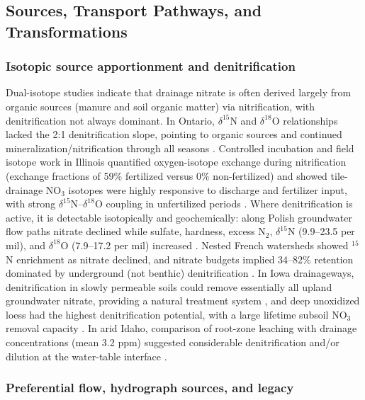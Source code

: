 \documentclass[11pt]{article}
\begin{document}
\subsection{Sources, Transport Pathways, and Transformations}

\subsubsection{Isotopic source apportionment and denitrification}

Dual-isotope studies indicate that drainage nitrate is often derived largely from organic sources (manure and soil organic matter) via nitrification, with denitrification not always dominant. In Ontario, $\delta^{15}$N and $\delta^{18}$O relationships lacked the 2:1 denitrification slope, pointing to organic sources and continued mineralization/nitrification through all seasons \parencite{Smith2011,Smith2011b}. Controlled incubation and field isotope work in Illinois quantified oxygen-isotope exchange during nitrification (exchange fractions of 59\% fertilized versus 0\% non-fertilized) and showed tile-drainage NO$_3$ isotopes were highly responsive to discharge and fertilizer input, with strong $\delta^{15}$N--$\delta^{18}$O coupling in unfertilized periods \parencite{Hu2024}. Where denitrification is active, it is detectable isotopically and geochemically: along Polish groundwater flow paths nitrate declined while sulfate, hardness, excess N$_2$, $\delta^{15}$N (9.9--23.5 per mil), and $\delta^{18}$O (7.9--17.2 per mil) increased \parencite{Dragon2016}. Nested French watersheds showed $^{15}$N enrichment as nitrate declined, and nitrate budgets implied 34--82\% retention dominated by underground (not benthic) denitrification \parencite{Billy2011,Billy2013}. In Iowa drainageways, denitrification in slowly permeable soils could remove essentially all upland groundwater nitrate, providing a natural treatment system \parencite{Schilling2007}, and deep unoxidized loess had the highest denitrification potential, with a large lifetime subsoil NO$_3$ removal capacity \parencite{Cambardella1999}. In arid Idaho, comparison of root-zone leaching with drainage concentrations (mean 3.2 ppm) suggested considerable denitrification and/or dilution at the water-table interface \parencite{ROBBINS1980}.

\subsubsection{Preferential flow, hydrograph sources, and legacy}
\end{document}

